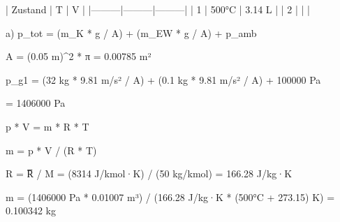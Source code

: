 | Zustand | T       | V       |  
|---------|---------|---------|  
| 1       | 500°C   | 3.14 L  |  
| 2       |         |         |  

a)  
p_tot = (m_K * g / A) + (m_EW * g / A) + p_amb  

A = (0.05 m)^2 * π = 0.00785 m²  

p_g1 = (32 kg * 9.81 m/s² / A) + (0.1 kg * 9.81 m/s² / A) + 100000 Pa  

= 1406000 Pa  

p * V = m * R * T  

m = p * V / (R * T)  

R = R̅ / M = (8314 J/kmol·K) / (50 kg/kmol) = 166.28 J/kg·K  

m = (1406000 Pa * 0.01007 m³) / (166.28 J/kg·K * (500°C + 273.15) K) = 0.100342 kg